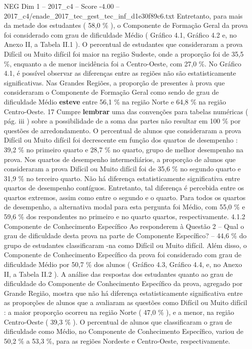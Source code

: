 \begin{textsample}{NEG Dim 1 – 2017\_c4 – Score -4.00 – 2017\_c4/enade\_2017\_tec\_gest\_tec\_inf\_d1e30f89c6.txt}
Entretanto, para mais da metade dos estudantes ( 58,0 \% ), o Componente de Formação Geral da prova foi considerado com grau de dificuldade Médio ( Gráfico 4.1, Gráfico 4.2 e, no Anexo II, a Tabela II.1 ).
O percentual de estudantes que consideraram a prova Difícil ou Muito difícil foi maior na região Sudeste, onde a proporção foi de 35,5 \%, enquanto a de menor incidência foi a Centro-Oeste, com 27,0 \%.
No Gráfico 4.1, é possível observar as diferenças entre as regiões não são estatisticamente significativas.
Nas Grandes Regiões, a proporção de presentes à prova que consideraram o Componente de Formação Geral como sendo de grau de dificuldade Médio \textbf{esteve} entre 56,1 \% na região Norte e 64,8 \% na região Centro-Oeste. 17 Cumpre \textbf{lembrar} uma das convenções para tabelas numéricas ( pág. iii ) sobre a possibilidade de a soma das partes não resultar em 100 \% por questões de arredondamento.
O percentual de alunos que consideraram a prova Difícil ou Muito difícil foi decrescente em função dos quartos de desempenho : 39,2 \% no primeiro quarto e 28,7 \% no quarto, grupo de melhor desempenho na prova.
Nos quartos de desempenho intermediários, a proporção de alunos que consideraram a prova Difícil ou Muito difícil foi de 35,6 \% no segundo quarto e 31,9 \% no terceiro quarto.
Não há diferença estatisticamente significativa entre quartos de desempenho contíguos.
Entretanto, tal diferença é percebida entre os quartos extremos, assim como entre o segundo e o quarto.
Para todos os quartos de desempenho, a alternativa modal para esta pergunta foi Médio, com 55,0 \% e 59,6 \% dos respondentes no primeiro e no quarto quartos, respectivamente. 4.1.2 Componente de Conhecimento Específico Ao responderem à Questão 2 – Qual o grau de dificuldade desta prova na parte de Componente Específico? – 44,6 \% do grupo de estudantes classificaram -na como Difícil ou Muito difícil.
Além disso, o Componente de Conhecimento Específico da prova foi considerado com grau de dificuldade Médio por 50,7 \% dos alunos ( Gráfico 4.3, Gráfico 4.4, e, no Anexo II, a Tabela II.2 ).
A análise das respostas dos estudantes quanto ao grau de dificuldade do Componente de Conhecimento Específico da prova, agregado por Grande Região, mostra que não há diferença estatisticamente significativa entre as proporções de alunos que a avaliaram as questões como Difícil ou Muito difícil : a maior proporção ocorreu na região Norte ( 47,0 \% ), e a menor, na região Centro-Oeste ( 39,3 \% ).
O percentual de alunos que classificaram o grau de dificuldade como Médio, no Componente de Conhecimento Específico, variou de 50,2 \% a 53,3 \%, para as regiões Nordeste e Centro-Oeste, respectivamente.

\end{textsample}
